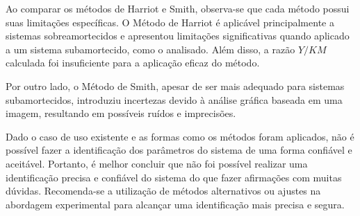 Ao comparar os métodos de Harriot e Smith, observa-se que cada método possui suas limitações específicas. O Método de Harriot é aplicável principalmente a sistemas sobreamortecidos e apresentou limitações significativas quando aplicado a um sistema subamortecido, como o analisado. Além disso, a razão \(Y/KM\) calculada foi insuficiente para a aplicação eficaz do método.

Por outro lado, o Método de Smith, apesar de ser mais adequado para sistemas subamortecidos, introduziu incertezas devido à análise gráfica baseada em uma imagem, resultando em possíveis ruídos e imprecisões.

Dado o caso de uso existente e as formas como os métodos foram aplicados, não é possível fazer a identificação dos parâmetros do sistema de uma forma confiável e aceitável. Portanto, é melhor concluir que não foi possível realizar uma identificação precisa e confiável do sistema do que fazer afirmações com muitas dúvidas. Recomenda-se a utilização de métodos alternativos ou ajustes na abordagem experimental para alcançar uma identificação mais precisa e segura.
